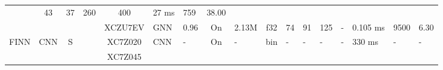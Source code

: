 \begin{table}
\begin{adjustbox}{totalheight=\baselineskip,}
\begin{tabular}{ccccclp{2em}cp{3em}cp{2em}p{4em}p{3em}p{3.5em}p{3.5em}p{2.5em}p{3em}}
                                       &\multirow{1}{*}{43}
                                           &\multirow{1}{*}{37}
                                               &\multirow{1}{*}{260}
                                                   &\multirow{1}{*}{400}
                                                       &\multirow{1}{*}{27 ms}
                                                           &\multirow{1}{*}{759}
                                                               &\multirow{1}{*}{38.00}\\
\cmidrule{4-17}
   &   &   &\multirow{1}{*}{\cite{zhangAccurateLowlatencyEfficient2022a}}
               &\multirow{1}{*}{XCZU7EV}
                   &\multirow{1}{*}{GNN}
                       &\multirow{1}{*}{0.96}
                           &\multirow{1}{*}{On}
                               &\multirow{1}{*}{2.13M}
                                   &\multirow{1}{*}{f32}
                                       &\multirow{1}{*}{74}
                                           &\multirow{1}{*}{91}
                                               &\multirow{1}{*}{125}
                                                   &\multirow{1}{*}{-}
                                                       &\multirow{1}{*}{0.105 ms}
                                                           &\multirow{1}{*}{9500}
                                                               &\multirow{1}{*}{6.30}\\
\cmidrule{1-17}
\multirow{4}{*}{FINN}
   &\multirow{4}{*}{CNN}
       &\multirow{4}{*}{S}
           &\multirow{1}{*}{\cite{hashimotoShipClassificationSAR2019a}}
               &\multirow{1}{*}{XC7Z020}
                   &\multirow{1}{*}{CNN}
                       &\multirow{1}{*}{-}
                           &\multirow{1}{*}{On}
                               &\multirow{1}{*}{-}
                                   &\multirow{1}{*}{bin}
                                       &\multirow{1}{*}{-}
                                           &\multirow{1}{*}{-}
                                               &\multirow{1}{*}{-}
                                                   &\multirow{1}{*}{-}
                                                       &\multirow{1}{*}{330 ms}
                                                           &\multirow{1}{*}{-}
                                                               &\multirow{1}{*}{-}\\
\cmidrule{4-17}
   &   &   &\multirow{1}{*}{\cite{myojinDetectingUncertainBNN2020}}
               &\multirow{1}{*}{XC7Z045}

\end{tabular}
\end{adjustbox}
\end{table}
